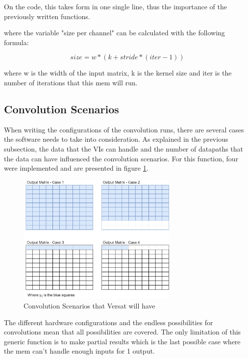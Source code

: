 On the code, this takes form in one single line, thus the importance of the previously written functions.



where the variable "size per channel" can be calculated with the following formula:

\[ size=w*(k+stride*(iter-1)) \]

where w is the width of the input matrix, k is the kernel size and iter is the number of iterations that this mem will run.

\subsection{Convolution Scenarios}
\label{ConvolutionScenarios}

When writing the configurations of the convolution runs, there are several cases the software needs to take into consideration.
As explained in the previous subsection, the data that the VIs can handle and the number of datapaths that the data can have influenced
the convolution scenarios. For this function, four were implemented and are presented in figure \ref{ConvScenarioss}.

\begin{figure}[!htbp]
    \centering
    \includegraphics[width=0.7\textwidth]{Figures/Variables.drawio.png}
    \caption{Convolution Scenarios that Versat will have}
    \label{ConvScenarioss}
\end{figure}

The different hardware configurations and the endless possibilities for convolutions mean that all possibilities are covered. 
The only limitation of this generic function is to make partial results which is the last possible case where the mem can't handle enough inputs for 
1 output.

